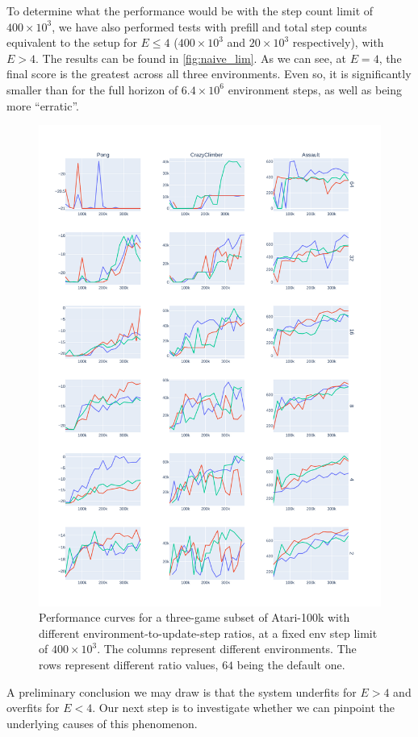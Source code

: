 \documentclass[twoside,11pt]{article}
\begin{document}
To determine what the performance would be with the step count limit of $400 \times 10^3$, we have also performed tests with prefill and total step counts equivalent to the setup for $E \leq 4$ ($400 \times 10^3$ and $20 \times 10^3$ respectively), with $E > 4$. The results can be found in \autoref{fig:naive_lim}. As we can see, at $E = 4$, the final score is the greatest across all three environments. Even so, it is significantly smaller than for the full horizon of $6.4 \times 10^6$ environment steps, as well as being more ``erratic''.

\begin{figure}
  \centering
  \includegraphics[width=0.8\linewidth,height=0.8\paperheight,keepaspectratio]{assets/naive_at_400k.pdf}
  \caption{Performance curves for a three-game subset of Atari-100k with different environment-to-update-step ratios, at a fixed env step limit of $400 \times 10^3$. The columns represent different environments. The rows represent different ratio values, $64$ being the default one.}
  \label{fig:naive_lim}
\end{figure}

A preliminary conclusion we may draw is that the system underfits for $E > 4$ and overfits for $E < 4$. Our next step is to investigate whether we can pinpoint the underlying causes of this phenomenon.
\end{document}
